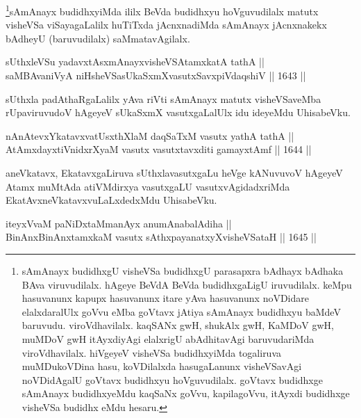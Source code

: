 \begin{artha}
\footnote{sAmAnayx budidhxgU visheVSa budidhxgU parasapxra bAdhayx bAdhaka BAva viruvudilalx. hAgeye BeVdA BeVda budidhxgaLigU iruvudilalx. keMpu hasuvanunx kapupx hasuvanunx itare yAva hasuvanunx noVDidare elalxdaralUlx goVvu eMba goVtavx jAtiya sAmAnayx budidhxyu baMdeV baruvudu. viroVdhavilalx. kaqSANx gwH, shukAlx gwH, KaMDoV gwH, muMDoV gwH itAyxdiyAgi elalxrigU abAdhitavAgi baruvudariMda viroVdhavilalx. hiVgeyeV visheVSa budidhxyiMda togaliruva muMDukoVDina hasu, koVDilalxda hasugaLanunx visheVSavAgi noVDidAgalU goVtavx budidhxyu hoVguvudilalx. goVtavx budidhxge sAmAnayx budidhxyeMdu kaqSaNx goVvu, kapilagoVvu, itAyxdi budidhxge visheVSa budidhx eMdu hesaru.}sAmAnayx budidhxyiMda ililx BeVda budidhxyu hoVguvudilalx matutx visheVSa viSayagaLalilx huTiTxda jAcnxnadiMda sAmAnayx jAcnxnakekx bAdheyU (baruvudilalx) saMmatavAgilalx.
\end{artha}


\begin{shl}
sUthxleVSu yadavxtAsxmAnayxvisheVSAtamxkatA tathA || \\
saMBAvaniVyA niHsheVSasUkaSxmXvasutxSavxpiVdaqshiV \hfill || 1643 ||  
\end{shl}

\begin{artha}
sUthxla padAthaRgaLalilx yAva riVti sAmAnayx matutx visheVSaveMba rUpaviruvudoV hAgeyeV sUkaSxmX vasutxgaLalUlx idu ideyeMdu UhisabeVku.
\end{artha}


\begin{shl}
nAnAtevxYkatavxvatUsxthXlaM daqSaTxM vasutx yathA tathA ||  \\
AtAmxdayxtiVnidxrXyaM vasutx vasutxtavxditi gamayxtAmf \hfill || 1644 ||  
\end{shl}

\begin{artha}
aneVkatavx, EkatavxgaLiruva sUthxlavasutxgaLu heVge kANuvuvoV hAgeyeV Atamx muMtAda atiVMdirxya vasutxgaLU vasutxvAgidadxriMda EkatAvxneVkatavxvuLaLxdedxMdu UhisabeVku.
\end{artha}


\begin{shl}
iteyxVvaM paNiDxtaMmanAyx anumAnabalAdiha  || \\
BinAnxBinAnxtamxkaM vasutx sAthxpayanatxyXvisheVSataH \hfill || 1645 ||  
\end{shl}

